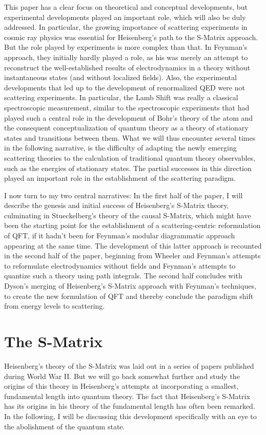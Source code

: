 \documentclass[12pt,a4paper]{article}
\begin{document}
This paper has a clear focus on theoretical and conceptual developments, but experimental developments played an important role, which will also be duly addressed. In particular, the growing importance of scattering experiments in cosmic ray physics was essential for Heisenberg's path to the S-Matrix approach. But the role played by experiments is more complex than that. In Feynman's approach, they initially hardly played a role, as his was merely an attempt to reconstruct the well-established results of electrodynamics in a theory without instantaneous states (and without localized fields). Also, the experimental developments that led up to the development of renormalized QED were not scattering experiments. In particular, the Lamb Shift was really a classical spectroscopic measurement, similar to the spectroscopic experiments that had played such a central role in the development of Bohr's theory of the atom and the consequent conceptualization of quantum theory as a theory of stationary states and transitions between them. What we will thus encounter several times in the following narrative, is the difficulty of adapting the newly emerging scattering theories to the calculation of traditional quantum theory observables, such as the energies of stationary states. The partial successes in this direction played an important role in the establishment of the scattering paradigm.

I now turn to my two central narratives: In the first half of the paper, I will describe the genesis and initial success of Heisenberg's S-Matrix theory, culminating in Stueckelberg's theory of the causal S-Matrix, which might have been the starting point for the establishment of a scattering-centric reformulation of QFT, if it hadn't been for Feynman's modular diagrammatic approach appearing at the same time. The development of this latter approach is recounted in the second half of the paper, beginning from Wheeler and Feynman's attempts to reformulate electrodynamics without fields and Feynman's attempts to quantize such a theory using path integrals. The second half concludes with Dyson's merging of Heisenberg's S-Matrix approach with Feynman's techniques, to create the new formulation of QFT and thereby conclude the paradigm shift from energy levels to scattering.


\section{The S-Matrix}

Heisenberg's theory of the S-Matrix was laid out in a series of papers published during World War II. But we will go back somewhat further and study the origins of this theory in Heisenberg's attempts at incorporating a smallest, fundamental length into quantum theory. The fact that Heisenberg's S-Matrix has its origins in his theory of the fundamental length has often been remarked. In the following, I will be discussing this development specifically with an eye to the abolishment of the quantum state.
\end{document}
